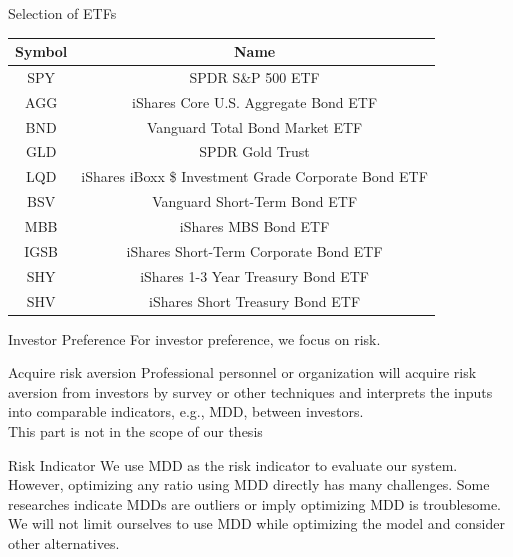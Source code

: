 \begin{frame}{Selection of ETFs}
    \begin{tabular}{|| c | c ||}
    \hline
    Symbol & Name  \\ \hline \hline
    SPY&SPDR S\&P 500 ETF \\ \hline
    AGG&iShares Core U.S. Aggregate Bond ETF \\ \hline
    BND&Vanguard Total Bond Market ETF \\ \hline
    GLD&SPDR Gold Trust \\ \hline
    LQD&iShares iBoxx \$ Investment Grade Corporate Bond ETF \\ \hline
    BSV&Vanguard Short-Term Bond ETF \\ \hline
    MBB&iShares MBS Bond ETF \\ \hline
    IGSB&iShares Short-Term Corporate Bond ETF \\ \hline
    SHY&iShares 1-3 Year Treasury Bond ETF \\ \hline
    SHV&iShares Short Treasury Bond ETF \\ \hline
    \end{tabular}
\end{frame}



\begin{frame}{Investor Preference}
For investor preference, we focus on risk.
\begin{block}{Acquire risk aversion}
Professional personnel or organization will acquire risk aversion from investors by survey or other techniques and interprets the inputs into comparable indicators, e.g., MDD, between investors.
\\
\alert{This part is not in the scope of our thesis}
\end{block}
\begin{block}{Risk Indicator}
We use MDD as the risk indicator to evaluate our system. However, optimizing any ratio using MDD directly has many challenges. Some researches indicate MDDs are outliers or imply optimizing MDD is troublesome. 
\\
\alert{We will not limit ourselves to use MDD while optimizing the model and consider other alternatives.}
\end{block}
\end{frame}



